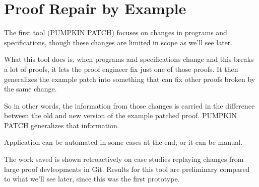 \chapter{Proof Repair by Example}

The first tool (PUMPKIN PATCH) focuses on changes in programs and specifications, though these changes are limited in scope as we'll see later.

What this tool does is, when programs and specifications change and this breaks a lot of proofs, it lets the proof engineer fix just one of those proofs. It then generalizes the example patch into something that can fix other proofs broken by the same change.

So in other words, the information from those changes is carried in the difference between the old and new version of the example patched proof.
PUMPKIN PATCH generalizes that information.

Application can be automated in some cases at the end, or it can be manual.

The work saved is shown retroactively on case studies replaying changes from large proof devleopments in Git. Results for this tool are preliminary compared to what we'll see later, since this was the first prototype.















